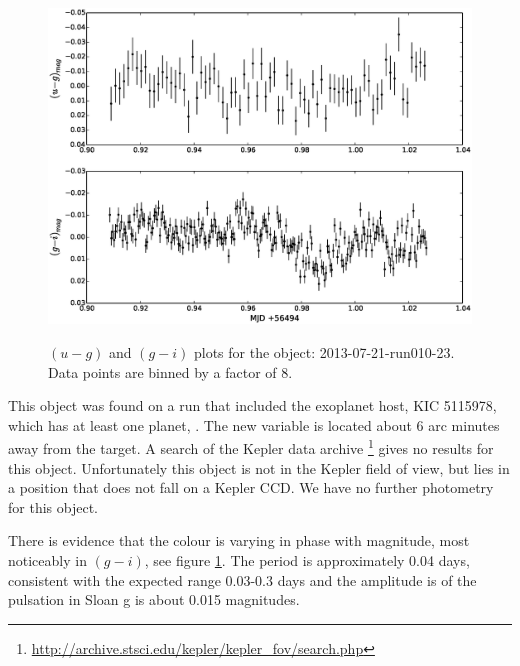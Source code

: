 \begin{figure}
  \center
  \includegraphics[width=120mm]{images/2013-07-21-run010-23_colourcurve-bin8.eps} \\
  \caption{$(u - g)$ and $(g - i)$ plots for the object: 2013-07-21-run010-23. Data points are binned by a factor of 8.}
  \label{fig:2013-07-21-run010-23-colour}
\end{figure}


This object was found on a run that included the exoplanet host, KIC 5115978, which has at least one planet, \citep{KIC5115978}. The new variable is located about 6 arc minutes away from the target. A search of the Kepler data archive \footnote{\url{http://archive.stsci.edu/kepler/kepler_fov/search.php}} gives no results for this object. Unfortunately this object is not in the Kepler field of view, but lies in a position that does not fall on a Kepler CCD. We have no further photometry for this object. 

There is evidence that the colour is varying in phase with magnitude, most noticeably in $(g - i)$, see figure \ref{fig:2013-07-21-run010-23-colour}. The period is approximately 0.04 days, consistent with the expected range 0.03-0.3 days and the amplitude is of the pulsation in Sloan g is about 0.015 magnitudes.

